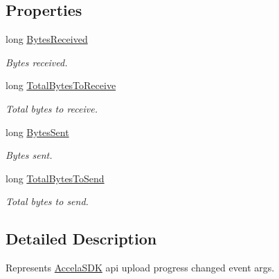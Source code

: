 \subsection*{Properties}
\begin{DoxyCompactItemize}
\item 
long \hyperlink{class_accela_1_1_windows_store_s_d_k_1_1_accela_upload_progress_changed_event_args_ac51d91c107c5f08f8337c03151b26556}{Bytes\+Received}
\begin{DoxyCompactList}\small\item\em Bytes received. \end{DoxyCompactList}\item 
long \hyperlink{class_accela_1_1_windows_store_s_d_k_1_1_accela_upload_progress_changed_event_args_a787b7c1b7dec1736e51dfe473563400c}{Total\+Bytes\+To\+Receive}
\begin{DoxyCompactList}\small\item\em Total bytes to receive. \end{DoxyCompactList}\item 
long \hyperlink{class_accela_1_1_windows_store_s_d_k_1_1_accela_upload_progress_changed_event_args_a1415de7cab0b1b20f3dff62f98f5c6c0}{Bytes\+Sent}
\begin{DoxyCompactList}\small\item\em Bytes sent. \end{DoxyCompactList}\item 
long \hyperlink{class_accela_1_1_windows_store_s_d_k_1_1_accela_upload_progress_changed_event_args_abc0c15f686481e729f7bd11bcc1c00bf}{Total\+Bytes\+To\+Send}
\begin{DoxyCompactList}\small\item\em Total bytes to send. \end{DoxyCompactList}\end{DoxyCompactItemize}


\subsection{Detailed Description}
Represents \hyperlink{class_accela_1_1_windows_store_s_d_k_1_1_accela_s_d_k}{Accela\+S\+D\+K} api upload progress changed event args. 



